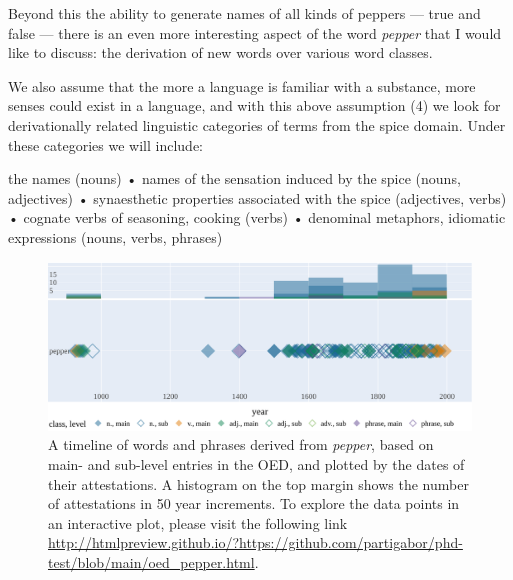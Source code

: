 
Beyond this the ability to generate names of all kinds of peppers --- true and false --- there is an even more interesting aspect of the word \textit{pepper} that I would like to discuss: the derivation of new words over various word classes.


\cdot

We also assume that the more a language is familiar with a substance, more senses could exist in a language, and with this above assumption (4) we look for derivationally related linguistic categories of terms from the spice domain. Under these categories we will include:

the names (nouns)
• names of the sensation induced by the spice (nouns, adjectives)
• synaesthetic properties associated with the spice (adjectives, verbs)
• cognate verbs of seasoning, cooking (verbs)
• denominal metaphors, idiomatic expressions (nouns, verbs, phrases)

\begin{figure}[ht!]
    \includegraphics[width=\linewidth]{imgs/plots/oed_pepper.pdf}
    \caption[A timeline of words and phrases derived from pepper.]{A timeline of words and phrases derived from \textit{pepper}, based on main- and sub-level entries in the OED, and plotted by the dates of their attestations. A histogram on the top margin shows the number of attestations in 50 year increments. To explore the data points in an interactive plot, please visit the following link \url{http://htmlpreview.github.io/?https://github.com/partigabor/phd-test/blob/main/oed_pepper.html}.}
    \label{fig:oed_pepper}
\end{figure}










